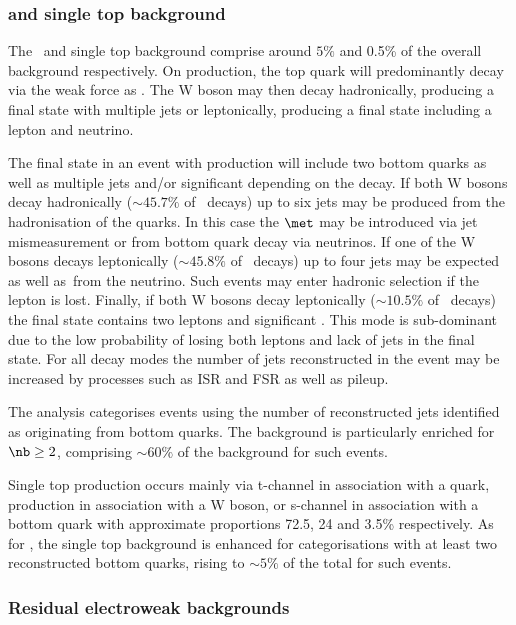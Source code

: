 \subsubsection{\ttj and single top background}

The \ttj~and single top background comprise around $5\%$ and 0.5\% of the overall
background respectively. On production, the top quark will predominantly decay via the 
weak force as \twb. The W boson may then decay hadronically, producing a final state
with multiple jets or leptonically, producing a final state including a lepton and neutrino. 

The final state in an event with \ttj production will include two bottom quarks as well as multiple 
jets and/or significant \met depending on the decay. If both W bosons decay hadronically ($\sim45.7\%$ of \ttbar~decays)
up to six jets may be produced from the hadronisation of the quarks. In this case the $\met$
may be introduced via jet mismeasurement or from bottom quark decay via neutrinos. If one of the 
W bosons decays leptonically ($\sim45.8\%$ of \ttbar~decays) up to four jets may be expected
as well as~\met from the neutrino. Such events may enter hadronic selection if the lepton is lost.
Finally, if both W bosons decay leptonically ($\sim10.5\%$ of \ttbar~decays) the final state contains two 
leptons and significant \met. This mode is sub-dominant due to the low probability of losing both leptons
and lack of jets in the final state. For all decay modes the number of jets reconstructed in the event
may be increased by processes such as ISR and FSR as well as pileup.

The \alphat analysis categorises events using the number of reconstructed 
jets identified as originating from bottom quarks. The \ttbar background is particularly
enriched for $\nb \ge 2$, comprising $\sim60\%$ of the background for such events.

Single top production occurs mainly via t-channel in association with a quark, production in 
association with a W boson, or s-channel in association with a bottom quark with approximate
proportions 72.5, 24 and 3.5\% respectively. As for \ttj, the single top background is enhanced for 
categorisations with at least two reconstructed bottom quarks, rising to $\sim5\%$ of the total for
such events.

\subsubsection{Residual electroweak backgrounds}

